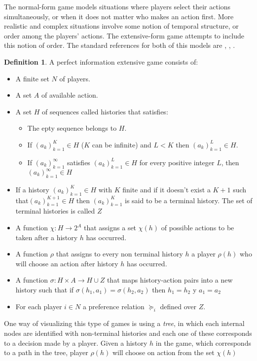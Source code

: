 \documentclass[english,letterpaper,12pt,final]{article}
\theoremstyle{definition}
\newtheorem{defi}{Definition}[section]
\begin{document}
The normal-form game models situations where players select their actions simultaneously, or when it does not matter who makes an action first. More realistic and complex situations involve some notion of temporal structure, or order among the players' actions. The extensive-form game attempts to include this notion of order. The standard references for both of this models are \cite{osborne1994course}, \cite{shoham2008multiagent}, \cite{10.1007/978-94-010-0189-2_25}.
\begin{defi}
A perfect information extensive game consists of:
\begin{itemize}
\item A finite set $N$ of players.
\item A set $A$ of available action.
\item A set $H$ of sequences called histories that satisfies:
	\begin{itemize}
		\item The epty sequence belongs to $H$.
		\item If $(a_k)_{k=1}^K \in H$ ($K$ can be infinite) and $L < K$ then $(a_k)_{k=1}^L \in H$.
		\item If $(a_k)_{k=1}^\infty$ satisfies $(a_k)_{k=1}^L \in H$ for every positive integer $L$, then $(a_k)_{k=1}^\infty \in H$
	\end{itemize}
\item If a history $(a_k)_{k=1}^K \in H$ with $K$ finite and if it doesn't exist a $K+1$ such that$(a_k)_{k=1}^{K+1} \in H$ then $(a_k)_{k=1}^K$ is said to be a terminal history. The set of terminal histories is called $Z$
\item A function $\chi : H \to 2^A$ that assigns a set  $\chi(h)$ of possible actions to be taken after a history $h$ has occurred.
\item A function $\rho$ that assigns to every non terminal history $h$ a player $\rho(h)$ who will choose an action after history $h$ has occurred.
\item A function $\sigma : H \times A \to H \cup Z$ that maps history-action pairs into a new  history such that  if $\sigma(h_1 , a_1) = \sigma (h_2,a_2)$ then $h_1 = h_2$ y $a_1 = a_2$
\item For each player $i \in N$ a preference relation $\succeq_i$ defined over $Z$.
\end{itemize}
\end{defi}

One way of visualizing this type of games is using a \textit{tree}, in which each internal nodes are identified with non-terminal histories and each one of these corresponds to a decision made by a player. Given a history $h$ in the game, which corresponds to a path in the tree, player $\rho(h)$ will choose on action from the set $\chi(h)$
\end{document}
